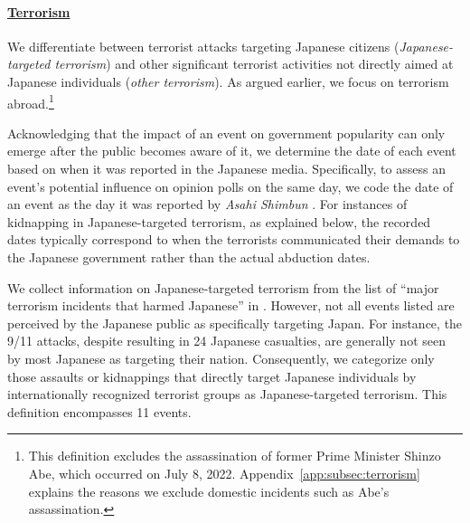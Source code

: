 \documentclass[letterpaper,12pt]{scrartcl}
\begin{document}
\bigskip
\noindent \paragraph{\uline{Terrorism}}
We differentiate between terrorist attacks targeting Japanese citizens (\emph{Japanese-targeted terrorism}) and other significant terrorist activities not directly aimed at Japanese individuals (\emph{other terrorism}). As argued earlier, we focus on terrorism abroad.\footnote{This definition excludes the assassination of former Prime Minister Shinzo Abe, which occurred on July 8, 2022. Appendix~\ref{app:subsec:terrorism} explains the reasons we exclude domestic incidents such as Abe's assassination.}

Acknowledging that the impact of an event on government popularity can only emerge after the public becomes aware of it, we determine the date of each event based on when it was reported in the Japanese media. Specifically, to assess an event's potential influence on opinion polls on the same day, we code the date of an event as the day it was reported by \emph{Asahi Shimbun} \citep{Newman2010ElectStud}. For instances of kidnapping in Japanese-targeted terrorism, as explained below, the recorded dates typically correspond to when the terrorists communicated their demands to the Japanese government rather than the actual abduction dates.

We collect information on Japanese-targeted terrorism from the list of ``major terrorism incidents that harmed Japanese'' in \citet{PCIA2023}. However, not all events listed are perceived by the Japanese public as specifically targeting Japan. For instance, the 9/11 attacks, despite resulting in 24 Japanese casualties, are generally not seen by most Japanese as targeting their nation. Consequently, we categorize only those assaults or kidnappings that directly target Japanese individuals by internationally recognized terrorist groups as Japanese-targeted terrorism. This definition encompasses 11 events.
\end{document}
